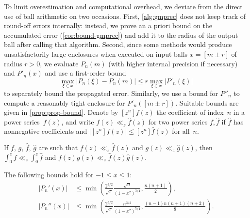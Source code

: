 \documentclass[nohypdvips,review]{siamart0216}
\begin{document}
To limit overestimation and computational overhead, we deviate from the
direct use of ball arithmetic on two occasions.
First, \cref{alg:gmprec} does not keep track of round-off
errors internally: instead, we prove an a priori bound on the
accumulated error (\cref{cor:bound-gmprec}) and add it to the
radius of the output ball after calling that algorithm.
Second, since some methods would produce unsatisfactorily large
enclosures when executed on input balls $x = [m \pm r]$ of radius
$r > 0$, we evaluate $P_n(m)$ (with higher internal precision if
necessary) and $P'_n(x)$ and use a first-order bound
\[ \max_{\xi \in x} |P_n(\xi) - P_n(m)|
   \le r \max_{\xi \in x} |P'_n(\xi)| \]
to separately bound the propagated error.
Similarly, we use a bound for $P''_n$ to compute a reasonably
tight enclosure for $P'_n([m \pm r])$.
Suitable bounds are given in \cref{prop:prop-bound}.
Denote by $[z^n] f(z)$ the coefficient of index $n$ in a power
series $f(z)$, and write $f(z) \ll_z \hat f(z)$
for two power series $f, \hat f$ if
$\hat f$ has nonnegative coefficients and
$| [z^n] f(z) | \leq [z^n] \hat f(z)$ for all $n$.

\begin{lemma} \label{lemma:majorants}
If $f$, $g$, $\hat f$, $\hat g$ are such that
$f(z) \ll_z \hat f(z)$ and $g(z) \ll_z \hat g(z)$, then
$\int_0^z f \ll_z \int_0^z \hat f$ and
$f(z)g(z) \ll_z \hat f(z) \hat g(z)$.
\end{lemma}

\begin{proposition} \label{prop:prop-bound}
The following bounds hold for $-1 \leq x \leq 1$:
\begin{align}
\label{eq:prop-bound}
  |P_n'(x)| &\le \min\left(
      \frac{2^{3/2}}{\sqrt{\pi}} \frac{\sqrt n}{(1-x^2)^{3/4}},
      \frac{n(n+1)}{2}
  \right), \\
\label{eq:prop-bound1}
  |P_n''(x)|
  &\le \min\left(
      \frac{2^{5/2}}{\sqrt{\pi}} \frac{n^{3/2}}{(1-x^2)^{5/4}},
      \frac{(n-1) n (n+1) (n+2)}{8}
  \right).
\end{align}
\end{proposition}
\end{document}
